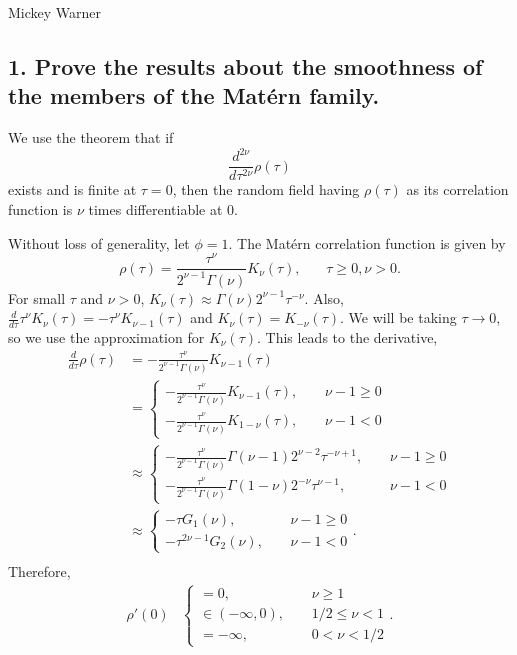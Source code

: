 \documentclass[12pt]{article}
\begin{document}
Mickey Warner

\subsection*{1. Prove the results about the smoothness of the members of the Mat{\'e}rn family.}

We use the theorem that if 
\[ \frac{d^{2\nu}}{d\tau^{2\nu}}\rho(\tau) \]
exists and is finite at $\tau=0$, then the random field having $\rho(\tau)$ as its correlation function is $\nu$ times differentiable at $0$.
\bigskip

Without loss of generality, let $\phi=1$. The Mat{\'e}rn correlation function is given by
\[ \rho(\tau) = \frac{\tau^\nu}{2^{\nu-1}\Gamma(\nu)}K_\nu(\tau),~~~~~~~~\tau\geq0,\nu>0. \]
For small $\tau$ and $\nu>0$, $K_\nu(\tau)\approx \Gamma(\nu)2^{\nu-1}\tau^{-\nu}$. Also, $\frac{d}{d\tau}\tau^\nu K_\nu(\tau)=-\tau^\nu K_{\nu-1}(\tau)$ and $K_\nu(\tau)=K_{-\nu}(\tau)$. We will be taking $\tau\rightarrow 0$, so we use the approximation for $K_\nu(\tau)$. This leads to the derivative,
\begin{align*}
\frac{d}{d\tau}\rho(\tau) &= -\frac{\tau^\nu}{2^{\nu-1}\Gamma(\nu)}K_{\nu-1}(\tau) \\
 &= \begin{cases} -\frac{\tau^\nu}{2^{\nu-1}\Gamma(\nu)}K_{\nu-1}(\tau),~~~~~&\nu-1\geq0 \\
 -\frac{\tau^\nu}{2^{\nu-1}\Gamma(\nu)}K_{1-\nu}(\tau),~~~~~&\nu-1<0 \end{cases} \\
 &\approx \begin{cases} -\frac{\tau^\nu}{2^{\nu-1}\Gamma(\nu)}\Gamma(\nu-1)2^{\nu-2}\tau^{-\nu+1},~~~~~&\nu-1\geq0 \\
 -\frac{\tau^\nu}{2^{\nu-1}\Gamma(\nu)}\Gamma(1-\nu)2^{-\nu}\tau^{\nu-1},~~~~~&\nu-1<0 \end{cases} \\
 &\approx \begin{cases} -\tau G_1(\nu),~~~~~&\nu-1\geq0 \\
 -\tau^{2\nu-1}G_2(\nu),~~~~~&\nu-1<0 \end{cases}. \\
\end{align*}
Therefore,
\begin{align*}
\rho'(0) &\begin{cases} =0,~~~~~&\nu\geq1 \\
 \in(-\infty,0),~~~~~&1/2\leq\nu<1  \\
 =-\infty,~~~~~&0<\nu<1/2 \end{cases}. \\
\end{align*}
\end{document}
